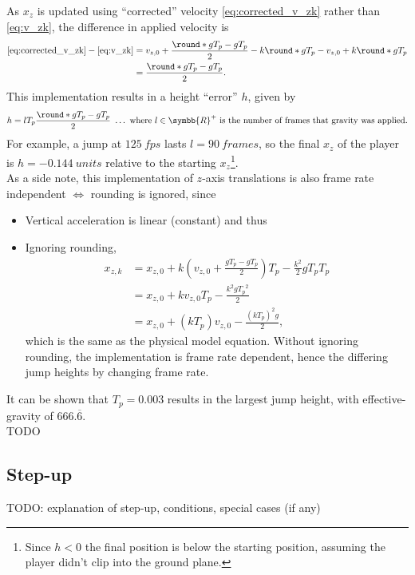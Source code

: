 As $x_z$ is updated using ``corrected'' velocity \eqref{eq:corrected_v_zk} rather than \eqref{eq:v_zk}, the difference in applied velocity is
\begin{align*}
\eqref{eq:corrected_v_zk} - \eqref{eq:v_zk} &= v_{z,0} + \frac{\round*{gT_p} - gT_p}{2} - k\round*{gT_p} - v_{z,0} + k\round*{gT_p}\\
&= \frac{\round*{gT_p} - gT_p}{2}.
\end{align*}
This implementation results in a height ``error'' $h$, given by
\begin{align}
\label{eq:height_error}
h = l T_p\frac{\round*{gT_p} - gT_p}{2}\ \ldots\ \text{where $l \in \symbb{R}^+$ is the number of frames that gravity was applied}.
\end{align}
For example, a jump at $\qty{125}{fps}$ lasts $l = \qty{90}{frames}$, so the final $x_z$ of the player is $h = \qty{-0.144}{units}$ relative to the starting $x_z$\footnote{Since $h < 0$ the final position is below the starting position, assuming the player didn't clip into the ground plane.}.\\

As a side note, this implementation of $z$-axis translations is also frame rate independent $\Longleftrightarrow$ rounding is ignored, since
\begin{itemize}
\item
Vertical acceleration is linear (constant) and thus
\item
Ignoring rounding,
\begin{align*}
x_{z,k} &= x_{z,0} + k\left(v_{z,0} + \frac{gT_p - gT_p}{2} \right) T_p - \frac{k^2}{2} gT_p T_p\\
&= x_{z,0} + kv_{z,0} T_p - \frac{k^2 g{T_p}^2}{2}\\
&= x_{z,0} + \left(kT_p \right) v_{z,0} - \frac{\left(kT_p \right)^2 g}{2},
\end{align*}
which is the same as the physical model equation.
Without ignoring rounding, the implementation is frame rate dependent, hence the differing jump heights by changing frame rate.
\end{itemize}

It can be shown that $T_p = 0.003$ results in the largest jump height, with effective-gravity of $666.\overline{6}$.\\
TODO


\subsection{Step-up}
\label{sec:stepup}
TODO: explanation of step-up, conditions, special cases (if any)\\

